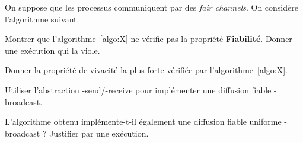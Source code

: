
\begingroup


\begin{exercice}

On suppose que les processus communiquent par des \emph{fair channels}.
On considère l'algorithme suivant.

\begin{algorithm}[H]
  \caption{Communication quasi-fiable (chaque message est considéré unique)}
  \label{algo:X}
\end{algorithm}

\begin{questions}
\item Montrer que l'algorithme~\ref{algo:X} ne vérifie pas la propriété \textbf{Fiabilité}. Donner une exécution qui la viole.
\item Donner la propriété de vivacité la plus forte vérifiée par l'algorithme~\ref{algo:X}.
\item Utiliser l'abstraction \X-send/\X-receive pour implémenter une diffusion fiable \RB-broadcast.
\item L'algorithme obtenu implémente-t-il également une diffusion fiable uniforme \URB-broadcast ?
  Justifier par une exécution.
\end{questions}

\end{exercice}

\endgroup
\endinput
